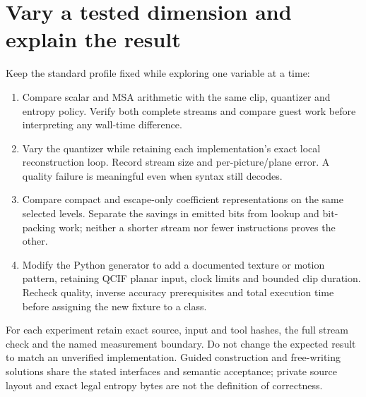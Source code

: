 \section{Vary a tested dimension and explain the result}
Keep the standard profile fixed while exploring one variable at a time:
\begin{enumerate}
  \item Compare scalar and MSA arithmetic with the same clip, quantizer and entropy
        policy. Verify both complete streams and compare guest work before interpreting
        any wall-time difference.
  \item Vary the quantizer while retaining each implementation's exact local
        reconstruction loop. Record stream size and per-picture/plane error. A quality
        failure is meaningful even when syntax still decodes.
  \item Compare compact and escape-only coefficient representations on the same
        selected levels. Separate the savings in emitted bits from lookup and bit-packing
        work; neither a shorter stream nor fewer instructions proves the other.
  \item Modify the Python generator to add a documented texture or motion pattern,
        retaining QCIF planar input, clock limits and bounded clip duration. Recheck
        quality, inverse accuracy prerequisites and total execution time before assigning
        the new fixture to a class.
\end{enumerate}
For each experiment retain exact source, input and tool hashes, the full stream
check and the named measurement boundary. Do not change the expected result to
match an unverified implementation. Guided construction and free-writing solutions
share the stated interfaces and semantic acceptance; private source layout and
exact legal entropy bytes are not the definition of correctness.
